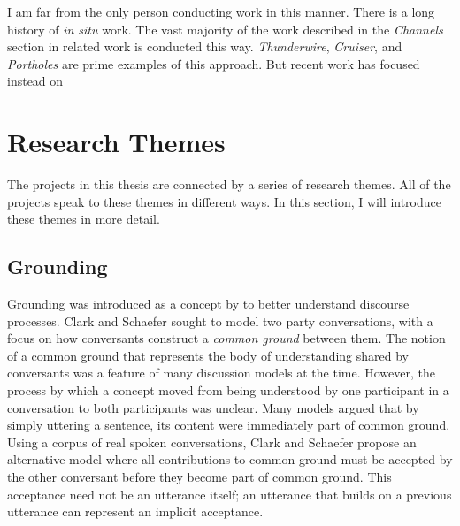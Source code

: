 % 




I am far from the only person conducting work in this manner. There is a long history of \emph{in situ} work. The vast majority of the work described in the \emph{Channels} section in related work is conducted this way. \emph{Thunderwire}, \emph{Cruiser}, and \emph{Portholes} are prime examples of this approach. But recent work has focused instead on 


\section{Research Themes}

The projects in this thesis are connected by a series of research themes. All of the projects speak to these themes in different ways. In this section, I will introduce these themes in more detail.

\subsection{Grounding}

Grounding was introduced as a concept by \citet{Clark:1989uc} to better understand discourse processes. Clark and Schaefer sought to model two party conversations, with a focus on how conversants construct a \emph{common ground} between them. The notion of a common ground that represents the body of understanding shared by conversants was a feature of many discussion models at the time. However, the process by which a concept moved from being understood by one participant in a conversation to both participants was unclear. Many models argued that by simply uttering a sentence, its content were immediately part of common ground. Using a corpus of real spoken conversations, Clark and Schaefer propose an alternative model where all contributions to common ground must be accepted by the other conversant before they become part of common ground. This acceptance need not be an utterance itself; an utterance that builds on a previous utterance can represent an implicit acceptance. 

